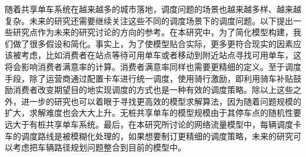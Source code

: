 \documentclass[]{tongjithesis}
\numberwithin{equation}{chapter}
\begin{document}
随着共享单车系统在越来越多的城市落地，调度问题的场景也越来越多样、越来越复杂。未来的研究还需要继续关注这些不同的调度场景下的调度问题。以下提出一些研究点作为未来的研究讨论的方向的参考。在本研究中，为了简化模型构建，我们做了很多假设和简化。事实上，为了使模型贴合实际，更多更符合现实的因素应该被考虑，比如消费者在站点等待可用单车或者移动到附近站点寻找可用单车，这将会影响消费者满意率的计算。消费者满意率同样也需要更精细的定义。至于调度手段，除了运营商通过配置卡车进行统一调度，使用骑行激励，即利用骑车补贴鼓励消费者改变期望目的地实现调度的方式也是一种有效的调度策略。除以上这些之外，进一步的研究也可以着眼于寻找更高效的模型求解算法，因为随着问题规模的扩大，求解难度也会大大上升。无桩共享单车的模型规模由于其停车点的随机性要远大于有桩共享单车系统。最后，在本研究所讨论的网络流量模型中，每辆调度卡车的调度路线是被模糊化处理的，如果想要制订更精细的调度策略，未来的研究可以考虑把车辆路径规划问题整合到目前的模型中。
\clearpage
\end{document}
